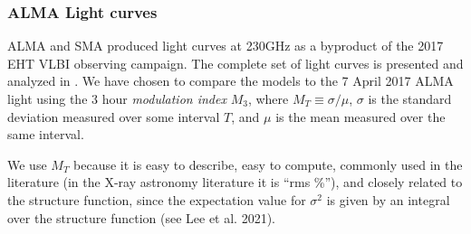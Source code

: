 
\subsubsection{ALMA Light curves}


ALMA and SMA produced \sgra light curves at 230GHz as a byproduct of the 2017 EHT VLBI observing campaign. The complete set of light curves is presented and analyzed in \cite{Wielgus2022}. We have chosen to compare the models to the 7 April 2017 ALMA light using
the 3 hour {\em modulation index} $M_3$, where $M_T \equiv
\sigma/\mu$, $\sigma$ is the standard deviation measured over some
interval $T$, and $\mu$ is the mean measured over the same interval.

We use $M_T$ because it is easy to describe, easy to compute, commonly used in the literature (in the X-ray astronomy literature it is ``rms \%''), and closely related to the structure function, since the expectation value for $\sigma^2$ is given by an integral over the structure function (see Lee et al. 2021).

